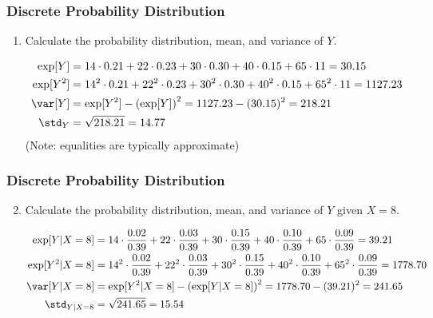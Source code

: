 \begin{frame}
\frametitle{Discrete Probability Distribution}
\begin{enumerate}\setcounter{enumi}{0}

\item Calculate the probability distribution, mean, and variance of $Y$. 

\begin{answer}
\begin{align*}
\exp[Y] 
& = 14 \cdot 0.21 + 
    22 \cdot 0.23 + 
    30 \cdot 0.30 + 
    40 \cdot 0.15 + 
    65 \cdot 11 
  = 30.15 \\
\exp[Y^2] 
& = 14^2 \cdot 0.21 + 
    22^2 \cdot 0.23 + 
    30^2 \cdot 0.30 + 
    40^2 \cdot 0.15 + 
    65^2 \cdot 11 
  = 1127.23 \\
\var[Y] 
& = \exp[Y^2] - \left(\exp[Y]\right)^2
  = 1127.23 - (30.15)^2 
  = 218.21 \\
\std_Y
& = \sqrt{218.21}
  = 14.77
\end{align*}
(Note: equalities are typically approximate)
\end{answer}

\end{enumerate}
\end{frame}


\begin{frame}
\frametitle{Discrete Probability Distribution}
\begin{enumerate}\setcounter{enumi}{1}

\item Calculate the probability distribution, mean, and variance of $Y$ given $X=8$.

\begin{answer}
\begin{footnotesize}
\begin{align*}
\exp[Y|X=8] 
& = 14 \cdot \frac{0.02}{0.39} + 
    22 \cdot \frac{0.03}{0.39} + 
    30 \cdot \frac{0.15}{0.39} + 
    40 \cdot \frac{0.10}{0.39} + 
    65 \cdot \frac{0.09}{0.39} 
  = 39.21 \\
\exp[Y^2|X=8] 
& = 14^2 \cdot \frac{0.02}{0.39} + 
    22^2 \cdot \frac{0.03}{0.39} + 
    30^2 \cdot \frac{0.15}{0.39} + 
    40^2 \cdot \frac{0.10}{0.39} + 
    65^2 \cdot \frac{0.09}{0.39}  
  = 1778.70 \\
\var[Y|X=8] 
& = \exp[Y^2|X=8] - \left(\exp[Y|X=8]\right)^2
  = 1778.70 - (39.21)^2 
  = 241.65 \\
\std_{Y|X=8}
& = \sqrt{241.65}
  = 15.54
\end{align*}
\end{footnotesize}
\end{answer}

\end{enumerate}
\end{frame}


